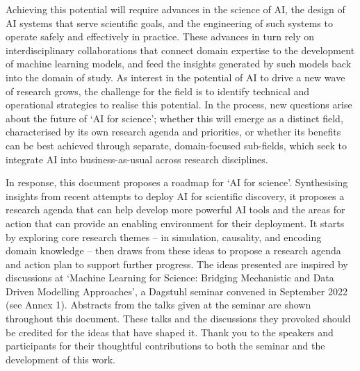Achieving this potential will require advances in the science of AI, the
design of AI systems that serve scientific goals, and the engineering of
such systems to operate safely and effectively in practice. These
advances in turn rely on interdisciplinary collaborations that connect
domain expertise to the development of machine learning models, and feed
the insights generated by such models back into the domain of study. As
interest in the potential of AI to drive a new wave of research grows,
the challenge for the field is to identify technical and operational
strategies to realise this potential. In the process, new questions
arise about the future of `AI for science'; whether this will emerge as
a distinct field, characterised by its own research agenda and
priorities, or whether its benefits can be best achieved through
separate, domain-focused sub-fields, which seek to integrate AI into
business-as-usual across research disciplines.

In response, this document proposes a roadmap for `AI for science'.
Synthesising insights from recent attempts to deploy AI for scientific
discovery, it proposes a research agenda that can help develop more
powerful AI tools and the areas for action that can provide an enabling
environment for their deployment. It starts by exploring core research
themes -- in simulation, causality, and encoding domain knowledge --
then draws from these ideas to propose a research agenda and action plan
to support further progress. The ideas presented are inspired by
discussions at `Machine Learning for Science: Bridging Mechanistic and
Data Driven Modelling Approaches', a Dagstuhl seminar convened in
September 2022 (see Annex 1). Abstracts from the talks given at the
seminar are shown throughout this document. These talks and the
discussions they provoked should be credited for the ideas that have
shaped it. Thank you to the speakers and participants for their
thoughtful contributions to both the seminar and the development of this
work.
